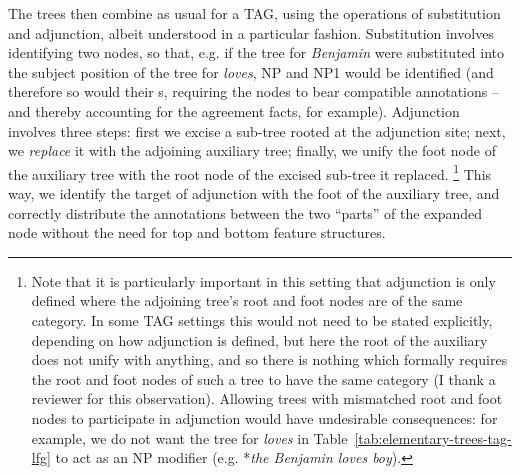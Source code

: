 \documentclass[output=paper,hidelinks]{langscibook}
\begin{document}
%
The trees then combine as usual for a TAG, using the operations of substitution
and adjunction, albeit understood in a particular fashion. Substitution involves
identifying two nodes, so that, e.g. if the tree for \textit{Benjamin} were
substituted into the subject position of the tree for \textit{loves}, NP and NP1
would be identified (and therefore so would their \fstruc{}s, requiring the
nodes to bear compatible annotations -- and thereby accounting for the agreement
facts, for example). Adjunction involves three steps: first we excise a sub-tree
rooted at the adjunction site; next, we \emph{replace} it with the adjoining
auxiliary tree; finally, we unify the foot node of the auxiliary tree with the
root node of the excised sub-tree it replaced.%
%
\footnote{Note that it is particularly important in this setting that adjunction
  is only defined where the adjoining tree's root and foot nodes are of the same
  category. In some TAG settings this would not need to be stated explicitly,
  depending on how adjunction is defined, but here the root of the auxiliary
  does not unify with anything, and so there is nothing which formally requires
  the root and foot nodes of such a tree to have the same category (I thank a
  reviewer for this observation). Allowing trees with mismatched root and foot
  nodes to participate in adjunction would have undesirable consequences: for
  example, we do not want the tree for \textit{loves} in
  Table~\ref{tab:elementary-trees-tag-lfg} to act as an NP modifier (e.g.
  *\textit{the Benjamin loves boy}).}
%
This way, we identify the target
of adjunction with the foot of the auxiliary tree, and correctly distribute the
annotations between the two ``parts'' of the expanded node without the need for
top and bottom feature structures.%
%
\end{document}
